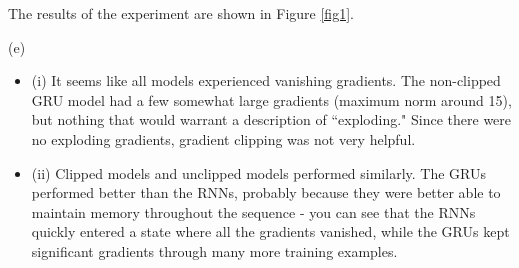 \documentclass{article}
\begin{document}
The results of the experiment are shown in Figure \ref{fig1}.

(e)

\begin{itemize}
\item (i) It seems like all models experienced vanishing gradients. The non-clipped GRU model had a few somewhat large gradients (maximum norm around 15), but nothing that would warrant a description of ``exploding." Since there were no exploding gradients, gradient clipping was not very helpful.
\item (ii) Clipped models and unclipped models performed similarly. The GRUs performed better than the RNNs, probably because they were better able to maintain memory throughout the sequence - you can see that the RNNs quickly entered a state where all the gradients vanished, while the GRUs kept significant gradients through many more training examples.
\end{itemize}
\end{document}

